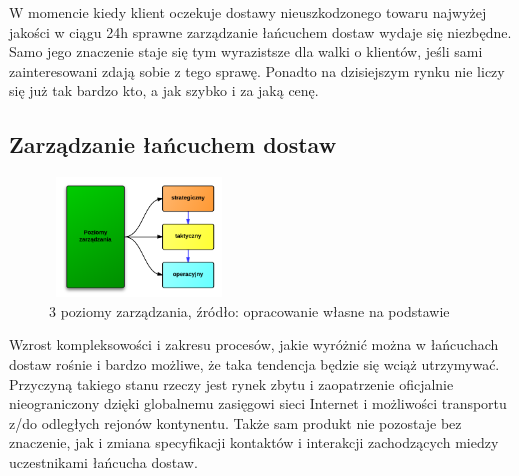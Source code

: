 		W momencie kiedy klient oczekuje dostawy nieuszkodzonego 
		towaru najwyżej jakości w ciągu 24h sprawne zarządzanie 
		łańcuchem dostaw wydaje się niezbędne. Samo jego znaczenie staje
		się tym wyrazistsze dla walki o klientów, jeśli sami zainteresowani
		zdają sobie z tego sprawę. Ponadto na dzisiejszym rynku nie liczy się
		już tak bardzo kto, a jak szybko i za jaką cenę.
	\subsection{Zarządzanie łańcuchem dostaw}
		\begin{figure}
			\vspace{-20pt}
			\begin{center}
				\includegraphics[width=180px, height=120px]{images/3LevelsScm}
			\end{center}
			\vspace{-18pt}
			\caption[3 poziomy zarządzania łańcuchem dostaw]{
				3 poziomy zarządzania, źródło: opracowanie własne na podstawie \cite{ewolucja_lancuchow_dostaw_cz1}
			}
			\vspace{-10pt}
		\end{figure}
		Wzrost kompleksowości i zakresu procesów, jakie wyróżnić można
		w łańcuchach dostaw rośnie i bardzo możliwe, że taka tendencja będzie
		się wciąż utrzymywać. Przyczyną takiego stanu rzeczy jest rynek zbytu
		i zaopatrzenie oficjalnie nieograniczony dzięki globalnemu zasięgowi
		sieci Internet i możliwości transportu z/do odległych rejonów kontynentu. Także
		sam produkt nie pozostaje bez znaczenie, jak i zmiana specyfikacji kontaktów
		i interakcji zachodzących miedzy uczestnikami łańcucha dostaw. \\
		
